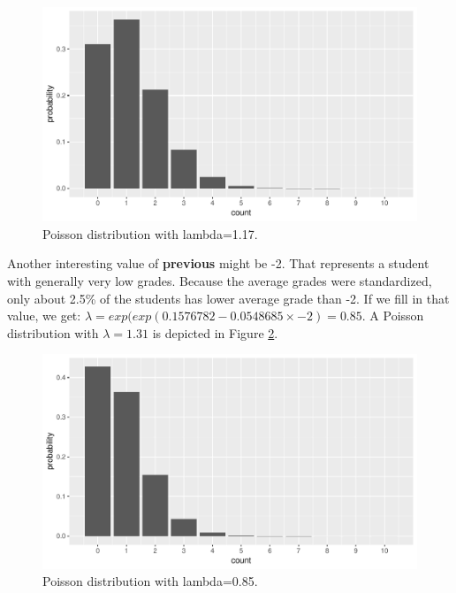 \documentclass[]{report}\usepackage[]{graphicx}\usepackage[]{color}
\makeatletter
\def\maxwidth{ %
  \ifdim\Gin@nat@width>\linewidth
    \linewidth
  \else
    \Gin@nat@width
  \fi
}
\newenvironment{knitrout}{}{} %
\makeatother
\begin{document}
\begin{knitrout}
\color{fgcolor}\begin{figure}

{\centering \includegraphics[width=\maxwidth]{figure/gen_16-1} 

}

\caption[Poisson distribution with lambda=1.17]{Poisson distribution with lambda=1.17.}\label{fig:gen_16}
\end{figure}


\end{knitrout}

Another interesting value of \textbf{previous} might be -2. That represents a student with generally very low grades. Because the average grades were standardized, only about 2.5\% of the students has lower average grade than -2. If we fill in that value, we get: $\lambda=exp(exp(0.1576782  -0.0548685 \times -2)= 0.85$. A Poisson distribution with $\lambda=1.31$ is depicted in Figure \ref{fig:gen_17}.

\begin{knitrout}
\color{fgcolor}\begin{figure}

{\centering \includegraphics[width=\maxwidth]{figure/gen_17-1} 

}

\caption[Poisson distribution with lambda=0.85]{Poisson distribution with lambda=0.85.}\label{fig:gen_17}
\end{figure}


\end{knitrout}
\end{document}

